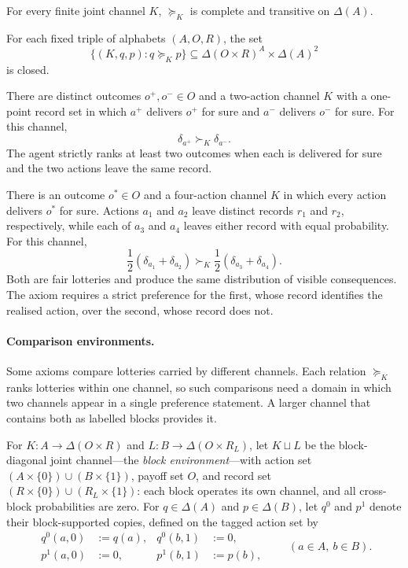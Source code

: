 \documentclass[11pt,a4paper]{article}
\theoremstyle{definition}
\newcommand{\D}{\Delta}
\newcommand{\1}{\mathbf 1}
\begin{document}
\begin{description}[leftmargin=*,style=sameline]

\item[(A1) Weak order.]
For every finite joint channel $K$, $\succeq_K$ is complete and transitive on $\D(A)$.

\item[(A2) Continuity.]
For each fixed triple of alphabets $(A,O,R)$, the set
\[
 \{(K,q,p):q\succeq_Kp\}
 \subseteq \D(O\times R)^A\times\D(A)^2
\]
is closed.


\item[(A3) Material relevance.]
There are distinct outcomes $o^+,o^-\in O$ and a two-action channel $K$ with a one-point record set in which $a^+$ delivers
$o^+$ for sure and $a^-$ delivers $o^-$ for sure.  For this channel,
\[
 \delta_{a^+}\succ_K\delta_{a^-}.
\]
The agent strictly ranks at least two outcomes when each is delivered for sure and the two actions leave the same record.

\item[(A4) Trace relevance.]
There is an outcome $o^\ast\in O$ and a four-action channel $K$ in which every action delivers $o^\ast$ for
sure.  Actions $a_1$ and $a_2$ leave distinct records $r_1$ and $r_2$, respectively, while each of $a_3$ and
$a_4$ leaves either record with equal probability.  For this channel,
\[
 \frac12(\delta_{a_1}+\delta_{a_2})
 \succ_K
 \frac12(\delta_{a_3}+\delta_{a_4}).
\]
Both are fair lotteries and produce the same distribution of visible consequences. The axiom requires a strict
preference for the first, whose record identifies the realised action, over the second, whose record does not.

\end{description}

\paragraph{Comparison environments.}
Some axioms compare lotteries carried by different channels.  Each relation $\succeq_K$ ranks lotteries within
one channel, so such comparisons need a domain in which two channels appear in a single preference statement.  A
larger channel that contains both as labelled blocks provides it.

For
$K:A\to\D(O\times R)$ and $L:B\to\D(O\times R_L)$, let $K\sqcup L$ be the block-diagonal joint channel---the
\emph{block environment}---with action set
$(A\times\{0\})\cup(B\times\{1\})$, payoff set $O$, and record set
$(R\times\{0\})\cup(R_L\times\{1\})$: each block operates its own channel, and all cross-block probabilities
are zero.  For $q\in\D(A)$ and $p\in\D(B)$,
let $q^0$ and $p^1$ denote their
block-supported copies, defined on the tagged action set by
\[
\begin{aligned}
 q^0(a,0)&:=q(a), & q^0(b,1)&:=0,\\
 p^1(a,0)&:=0,    & p^1(b,1)&:=p(b),
\end{aligned}
\qquad(a\in A,\ b\in B).
\]
\end{document}

